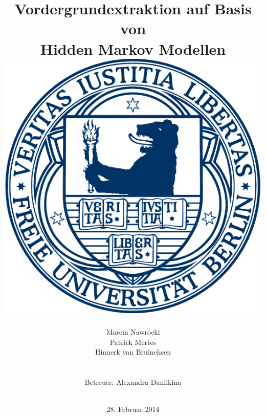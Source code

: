 \documentclass[11pt,a4paper,ngerman,bibtotoc]{scrartcl}
\title{
	\vspace{10mm}
	Vordergrundextraktion auf Basis von\\ Hidden Markov Modellen\\
	\vspace{10mm}
	\includegraphics{bilder/fu_logo.png}	%
	\vspace{10mm}
}
\author{Marcin Nawrocki\\Patrick Mertes\\Hinnerk van Bruinehsen\\\\\\Betreuer: Alexandra Danilkina\\\\}
\date{28. Februar 2014}
\begin{document}
\maketitle\thispagestyle{empty}
\newpage
\tableofcontents
\newpage







\nocite{lamarre2002tracking}

\newpage
\listoffigures	%

\printbibliography
\end{document}
